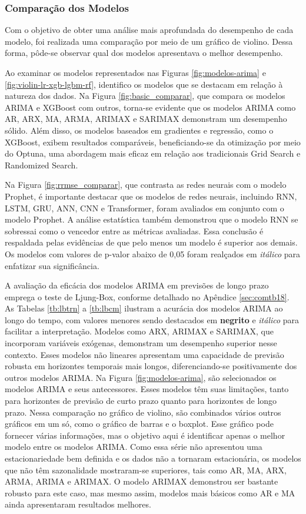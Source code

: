 \subsubsection{Compara\c c\~ao dos Modelos}

Com o objetivo de obter uma análise mais aprofundada do desempenho de cada modelo, foi realizada uma comparação por meio de um gráfico de violino. Dessa forma, pôde-se observar qual dos modelos apresentava o melhor desempenho.



Ao examinar os modelos representados nas Figuras \ref{fig:modelos-arima} e \ref{fig:violin-lr-xgb-lgbm-rf}, identifico os modelos que se destacam em relação à natureza dos dados. Na Figura \ref{fig:basic_comparar}, que compara os modelos ARIMA e XGBoost com outros, torna-se evidente que os modelos ARIMA como AR, ARX, MA, ARMA, ARIMAX e SARIMAX demonstram um desempenho sólido. Além disso, os modelos baseados em gradientes e regressão, como o XGBoost, exibem resultados comparáveis, beneficiando-se da otimização por meio do Optuna, uma abordagem mais eficaz em relação aos tradicionais Grid Search e Randomized Search.

Na Figura \ref{fig:rrmse_comparar}, que contrasta as redes neurais com o modelo Prophet, é importante destacar que os modelos de redes neurais, incluindo RNN, LSTM, GRU, ANN, CNN e Transformer, foram avaliados em conjunto com o modelo Prophet. A análise estatística também demonstrou que o modelo RNN se sobressai como o vencedor entre as métricas avaliadas. Essa conclusão é respaldada pelas evidências de que pelo menos um modelo é superior aos demais. Os modelos com valores de p-valor abaixo de 0,05 foram realçados em \textit{itálico} para enfatizar sua significância.

A avaliação da eficácia dos modelos ARIMA em previsões de longo prazo emprega o teste de Ljung-Box, conforme detalhado no Apêndice \ref{sec:comtb18}. As Tabelas \ref{tb:lbtrn} a \ref{tb:lbcm} ilustram a acurácia dos modelos ARIMA ao longo do tempo, com valores menores sendo destacados em \textbf{negrito} e \textit{itálico} para facilitar a interpretação. Modelos como ARX, ARIMAX e SARIMAX, que incorporam variáveis exógenas, demonstram um desempenho superior nesse contexto. Esses modelos não lineares apresentam uma capacidade de previsão robusta em horizontes temporais mais longos, diferenciando-se positivamente dos outros modelos ARIMA. Na Figura \ref{fig:modelos-arima}, são selecionados os modelos ARIMA e seus antecessores. Esses modelos têm suas limitações, tanto para horizontes de previsão de curto prazo quanto para horizontes de longo prazo. Nessa comparação no gráfico de violino, são combinados vários outros gráficos em um só, como o gráfico de barras e o boxplot. Esse gráfico pode fornecer várias informações, mas o objetivo aqui é identificar apenas o melhor modelo entre os modelos ARIMA.
Como essa série não apresentou uma estacionariedade bem definida e os dados não a tornaram estacionária, os modelos que não têm sazonalidade mostraram-se superiores, tais como AR, MA, ARX, ARMA, ARIMA e ARIMAX. O modelo ARIMAX demonstrou ser bastante robusto para este caso, mas mesmo assim, modelos mais básicos como AR e MA ainda apresentaram resultados melhores.

